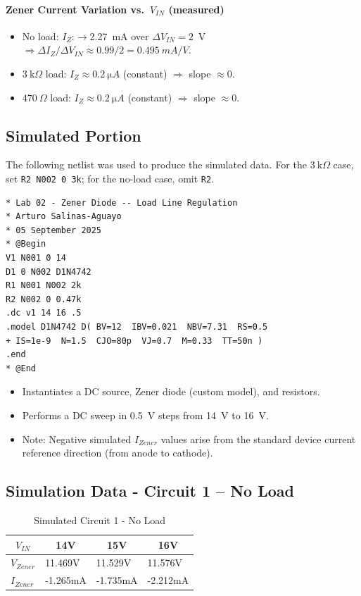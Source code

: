 \documentclass[12pt]{article}
\begin{document}
\paragraph{Zener Current Variation vs.\ $V_{IN}$ (measured)}
\begin{itemize}
  \item No load: $I_Z$:$\to$2.27~mA over $\Delta V_{IN}=2$~V
  $\Rightarrow \Delta I_Z/\Delta V_{IN}\approx 0.99/2=\SI{0.495}{mA/V}$.
  \item $3~\text{k}\Omega$ load: $I_Z \approx \SI{0.2}{\micro A}$ (constant) $\Rightarrow$ slope $\approx 0$.
  \item $470~\Omega$ load: $I_Z \approx \SI{0.2}{\micro A}$ (constant) $\Rightarrow$ slope $\approx 0$.
\end{itemize}

\subsection{Simulated Portion}
The following netlist was used to produce the simulated data. For the $3~\text{k}\Omega$
case, set \verb|R2 N002 0 3k|; for the no-load case, omit \verb|R2|.
\begin{verbatim}
* Lab 02 - Zener Diode -- Load Line Regulation
* Arturo Salinas-Aguayo
* 05 September 2025
* @Begin
V1 N001 0 14
D1 0 N002 D1N4742
R1 N001 N002 2k
R2 N002 0 0.47k
.dc v1 14 16 .5
.model D1N4742 D( BV=12  IBV=0.021  NBV=7.31  RS=0.5
+ IS=1e-9  N=1.5  CJO=80p  VJ=0.7  M=0.33  TT=50n )
.end
* @End
\end{verbatim}
\begin{itemize}
  \item Instantiates a DC source, Zener diode (custom model), and resistors.
  \item Performs a DC sweep in \SI{0.5}{V} steps from \SI{14}{V} to \SI{16}{V}.
  \item Note: Negative simulated $I_{Zener}$ values arise from the standard device current reference direction (from anode to cathode).
\end{itemize}

\subsection{Simulation Data - Circuit 1 -- No Load}
\begin{table}[H]
  \caption{Simulated Circuit 1 - No Load}\label{tab:simnoload}
  \begin{center}
    \begin{tabular}[c]{|l|l|l|l|}
      \hline
      \multicolumn{1}{|c|}{\textbf{$V_{IN}$}} &
      \multicolumn{1}{|c|}{\textbf{14V}} &
      \multicolumn{1}{|c|}{\textbf{15V}} &
      \multicolumn{1}{|c|}{\textbf{16V}} \\
      \hline
      \textbf{$V_{Zener}$} & 11.469V & 11.529V & 11.576V \\
      \textbf{$I_{Zener}$} & -1.265mA & -1.735mA & -2.212mA \\
      \hline
    \end{tabular}
  \end{center}
\end{table}
\end{document}
